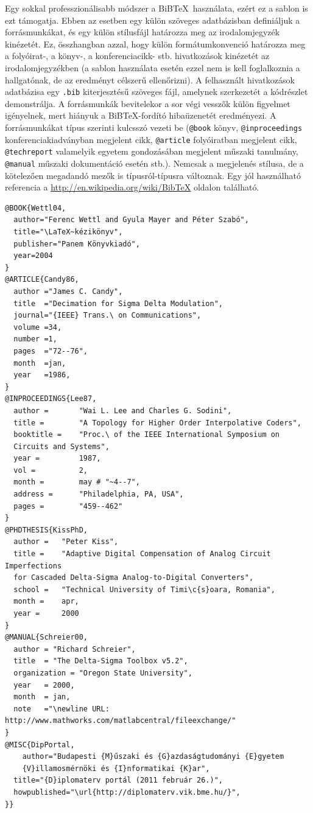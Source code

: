 Egy sokkal professzionálisabb módszer a BiB\TeX~használata, ezért ez a sablon is ezt támogatja. Ebben az esetben egy külön szöveges adatbázisban definiáljuk a forrásmunkákat, és egy külön stílusfájl határozza meg az irodalomjegyzék kinézetét. Ez, összhangban azzal, hogy külön formátumkonvenció határozza meg a folyóirat-, a könyv-, a konferenciacikk- stb. hivatkozások kinézetét az irodalomjegyzékben (a sablon használata esetén ezzel nem is kell foglalkoznia a hallgatónak, de az eredményt célszerű ellenőrizni). A felhasznált hivatkozások adatbázisa egy \verb+.bib+ kiterjesztésű szöveges fájl, amelynek szerkezetét a  kódrészlet demonstrálja. A forrásmunkák bevitelekor a sor végi vesszők külön figyelmet igényelnek, mert hiányuk a BiB\TeX-fordító hibaüzenetét eredményezi. A forrásmunkákat típus szerinti kulcsszó vezeti be (\verb+@book+ könyv, \verb+@inproceedings+ konferenciakiadványban megjelent cikk, \verb+@article+ folyóiratban megjelent cikk, \verb+@techreport+ valamelyik egyetem gondozásában megjelent műszaki tanulmány, \verb+@manual+ műszaki dokumentáció esetén stb.). Nemcsak a megjelenés stílusa, de a kötelezően megadandó mezők is típusról-típusra változnak. Egy jól használható referencia a \url{http://en.wikipedia.org/wiki/BibTeX} oldalon található.
\begin{lstlisting}[frame=single,float=!ht,caption=Példa szöveges irodalomjegyzék-adatbázisra BiBTeX használata esetén., label=listing:Bibtex]
@BOOK{Wettl04,
  author="Ferenc Wettl and Gyula Mayer and Péter Szabó",
  title="\LaTeX~kézikönyv",
  publisher="Panem Könyvkiadó",
  year=2004
}
@ARTICLE{Candy86,
  author ="James C. Candy",
  title  ="Decimation for Sigma Delta Modulation",
  journal="{IEEE} Trans.\ on Communications",
  volume =34,
  number =1,
  pages  ="72--76",
  month  =jan,
  year   =1986,
}
@INPROCEEDINGS{Lee87,
  author =       "Wai L. Lee and Charles G. Sodini",
  title =        "A Topology for Higher Order Interpolative Coders",
  booktitle =    "Proc.\ of the IEEE International Symposium on 
  Circuits and Systems",
  year =         1987,
  vol =          2,
  month =        may # "~4--7",
  address =      "Philadelphia, PA, USA",
  pages =        "459--462"
}
@PHDTHESIS{KissPhD,
  author =   "Peter Kiss",
  title =    "Adaptive Digital Compensation of Analog Circuit Imperfections 
  for Cascaded Delta-Sigma Analog-to-Digital Converters",
  school =   "Technical University of Timi\c{s}oara, Romania",
  month =    apr,
  year =     2000
}
@MANUAL{Schreier00,
  author = "Richard Schreier",
  title  = "The Delta-Sigma Toolbox v5.2",
  organization = "Oregon State University",
  year   = 2000,
  month  = jan,
  note   ="\newline URL: http://www.mathworks.com/matlabcentral/fileexchange/"
}
@MISC{DipPortal,
	author="Budapesti {M}űszaki és {G}azdaságtudományi {E}gyetem 
	{V}illamosmérnöki és {I}nformatikai {K}ar",
  title="{D}iplomaterv portál (2011 február 26.)",
  howpublished="\url{http://diplomaterv.vik.bme.hu/}",
}}
\end{lstlisting}

